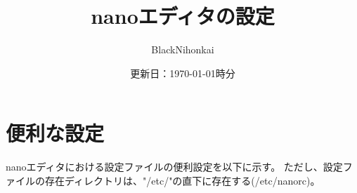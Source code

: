 \documentclass[a4paper,10pt]{jsarticle}
\title{nanoエディタの設定}
\author{BlackNihonkai}
\date{更新日：\today  \the\hour 時\the\minute 分}
\begin{document}
\maketitle



\section{便利な設定}
  nanoエディタにおける設定ファイルの便利設定を以下に示す。
  ただし、設定ファイルの存在ディレクトリは、"/etc/"の直下に存在する(/etc/nanorc)。
\end{document}

